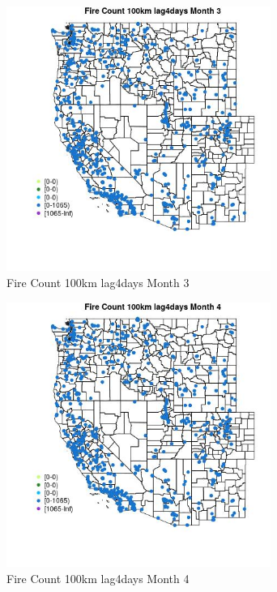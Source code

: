 \begin{figure} 
\centering  
\includegraphics[width=0.77\textwidth]{Code_Outputs/Report_ML_input_PM25_Step4_part_f_de_duplicated_aves_prioritize_24hr_obswNAs_MapObsMo3Fire_Count_100km_lag4days.jpg} 
\caption{\label{fig:Report_ML_input_PM25_Step4_part_f_de_duplicated_aves_prioritize_24hr_obswNAsMapObsMo3Fire_Count_100km_lag4days}Fire Count 100km lag4days Month 3} 
\end{figure} 
 

\begin{figure} 
\centering  
\includegraphics[width=0.77\textwidth]{Code_Outputs/Report_ML_input_PM25_Step4_part_f_de_duplicated_aves_prioritize_24hr_obswNAs_MapObsMo4Fire_Count_100km_lag4days.jpg} 
\caption{\label{fig:Report_ML_input_PM25_Step4_part_f_de_duplicated_aves_prioritize_24hr_obswNAsMapObsMo4Fire_Count_100km_lag4days}Fire Count 100km lag4days Month 4} 
\end{figure} 
 

